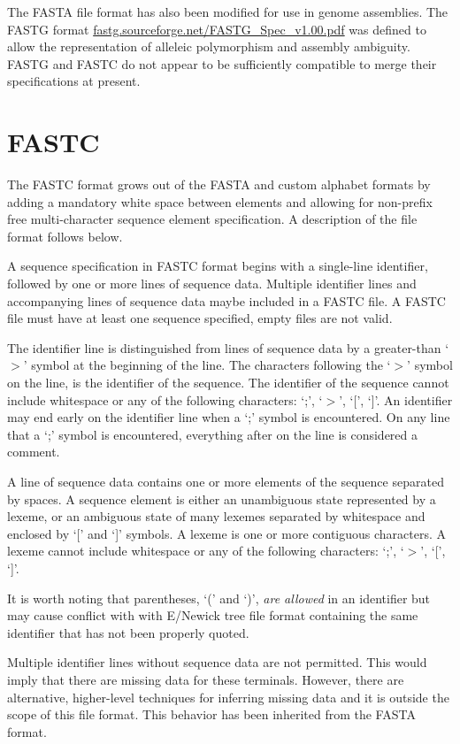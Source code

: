 \documentclass[12pt]{article}
\begin{document}
The FASTA file format has also been modified for use in genome assemblies. The FASTG format \url{fastg.sourceforge.net/FASTG_Spec_v1.00.pdf} was defined to allow the
representation of alleleic polymorphism and assembly ambiguity.  FASTG and FASTC do not appear to be sufficiently compatible to merge their specifications at present.

\section{FASTC}
The FASTC format grows out of the FASTA and custom alphabet formats by adding a mandatory white space between elements and allowing for non-prefix free multi-character sequence element specification. A description of the file format follows below.

A sequence specification in FASTC format begins with a single-line identifier, followed by one or more lines of sequence data. Multiple identifier lines and accompanying lines of sequence data maybe included in a FASTC file. A FASTC file must have at least one sequence specified, empty files are not valid.

The identifier line is distinguished from lines of sequence data by a greater-than `$>$' symbol at the beginning of the line.
The characters following the `$>$' symbol on the line, is the identifier of the sequence.
The identifier of the sequence cannot include whitespace or any of the following characters: `;', `$>$', `[', `]'.
An identifier may end early on the identifier line when a `;' symbol is encountered. On any line that a `;' symbol is encountered, everything after on the line is considered a comment.

A line of sequence data contains one or more elements of the sequence separated by spaces.
A sequence element is either an unambiguous state represented by a lexeme, or an ambiguous state of many lexemes separated by whitespace and enclosed by `[' and `]' symbols. A lexeme is one or more contiguous characters. A lexeme cannot include whitespace or any of the following characters: `;', `$>$', `[', `]'.

It is worth noting that parentheses, `(' and `)', \textit{are allowed} in an identifier but may cause conflict with with E/Newick tree file format \citep{Cardonaetal2008} containing the same identifier that has not been properly quoted.

Multiple identifier lines without sequence data are not permitted. This would imply that there are missing data for these terminals. However, there are alternative, higher-level techniques for inferring missing data and it is outside the scope of this file format. This behavior has been inherited from the FASTA format.
\end{document}
